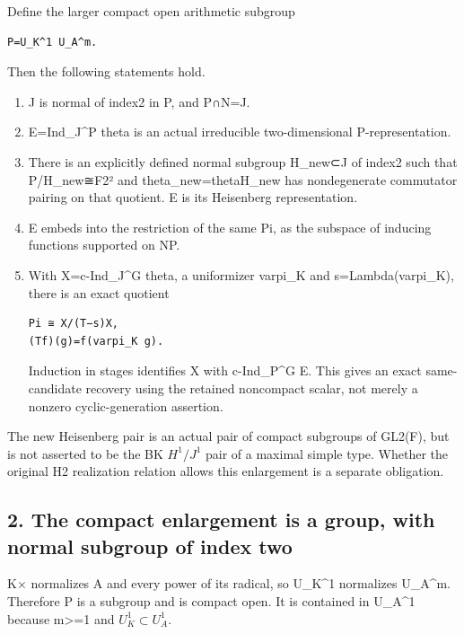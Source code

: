 Define the larger compact open arithmetic subgroup

\begin{Verbatim}[fontsize=\small,breaklines=true,breakanywhere=true]
P=U_K^1 U_A^m.
\end{Verbatim}

Then the following statements hold.

\begin{enumerate}
\def\labelenumi{\arabic{enumi}.}
\item
  J is normal of index2 in P, and P∩N=J.
\item
  E=Ind\_J\^{}P theta is an actual irreducible two-dimensional
  P-representation.
\item
  There is an explicitly defined normal subgroup H\_new⊂J of index2 such
  that P/H\_new≅F2² and theta\_new=theta\textbar H\_new has
  nondegenerate commutator pairing on that quotient. E is its Heisenberg
  representation.
\item
  E embeds into the restriction of the same Pi, as the subspace of
  inducing functions supported on NP.
\item
  With X=c-Ind\_J\^{}G theta, a uniformizer varpi\_K and
  s=Lambda(varpi\_K), there is an exact quotient

\begin{Verbatim}[fontsize=\small,breaklines=true,breakanywhere=true]
Pi ≅ X/(T−s)X,
(Tf)(g)=f(varpi_K g).
\end{Verbatim}

  Induction in stages identifies X with c-Ind\_P\^{}G E. This gives an
  exact same-candidate recovery using the retained noncompact scalar,
  not merely a nonzero cyclic-generation assertion.
\end{enumerate}

The new Heisenberg pair is an actual pair of compact subgroups of
GL2(F), but is not asserted to be the BK \(H^1/J^1\) pair of
a maximal simple type. Whether the original H2 realization relation
allows this enlargement is a separate obligation.

\hypertarget{rank~2-the-compact-enlargement-is-a-group-with-normal-subgroup-of-index-two}{%
\subsection{2. The compact enlargement is a group, with normal subgroup
of index
two}\label{rank~2-the-compact-enlargement-is-a-group-with-normal-subgroup-of-index-two}}

K× normalizes A and every power of its radical, so U\_K\^{}1 normalizes
U\_A\^{}m. Therefore P is a subgroup and is compact open. It is
contained in U\_A\^{}1 because m\textgreater=1 and
\(U_K^1\subset U_A^1\).

